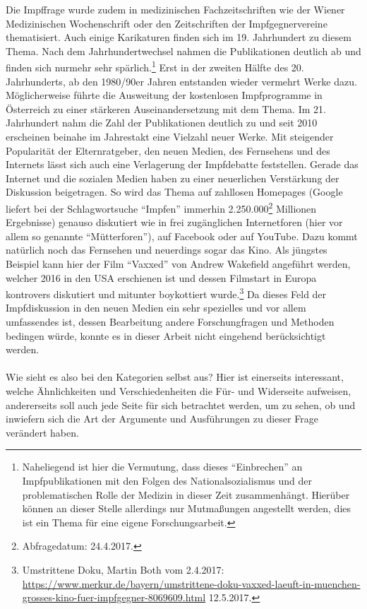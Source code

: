 \documentclass[
    a4paper,
    12pt,
    hyphens,
    chapterprefix=true,
    headheight=33pt,
    footheight=29pt,
    headings=optiontohead, %
]{scrartcl}
\begin{document}
{ Die Impffrage wurde zudem in medizinischen Fachzeitschriften wie der Wiener Medizinischen Wochenschrift oder den Zeitschriften der Impfgegnervereine thematisiert. Auch einige Karikaturen finden sich im 19. Jahrhundert zu diesem Thema. Nach dem Jahrhundertwechsel nahmen die Publikationen deutlich ab und finden sich nurmehr sehr spärlich.\footnote{Naheliegend ist hier die Vermutung, dass dieses "`Einbrechen"' an Impfpublikationen mit den Folgen des Nationalsozialismus und der problematischen Rolle der Medizin in dieser Zeit zusammenhängt. Hierüber können an dieser Stelle allerdings nur Mutmaßungen angestellt werden, dies ist ein Thema für eine eigene Forschungsarbeit.} Erst in der zweiten Hälfte des 20. Jahrhunderts, ab den 1980/90er Jahren entstanden wieder vermehrt Werke dazu. Möglicherweise führte die Ausweitung der kostenlosen Impfprogramme in Österreich zu einer stärkeren Auseinandersetzung mit dem Thema. Im 21. Jahrhundert nahm die Zahl der Publikationen deutlich zu und seit 2010 erscheinen beinahe im Jahrestakt eine Vielzahl neuer Werke. Mit steigender Popularität der Elternratgeber, den neuen Medien, des Fernsehens und des Internets lässt sich auch eine Verlagerung der Impfdebatte feststellen. Gerade das Internet und die sozialen Medien haben zu einer neuerlichen Verstärkung der Diskussion beigetragen. So wird das Thema auf zahllosen Homepages (Google liefert bei der Schlagwortsuche "`Impfen"' immerhin 2.250.000\footnote{Abfragedatum: 24.4.2017.} Millionen Ergebnisse) genauso diskutiert wie in frei zugänglichen Internetforen (hier vor allem so genannte "`Mütterforen"'), auf Facebook oder auf YouTube. Dazu kommt natürlich noch das Fernsehen und neuerdings sogar das Kino. Als jüngstes Beispiel kann hier der Film "`Vaxxed"' von Andrew Wakefield angeführt werden, welcher 2016 in den USA erschienen ist und dessen Filmstart in Europa kontrovers diskutiert und mitunter boykottiert wurde.\footnote{Umstrittene Doku, Martin Both vom 2.4.2017: \url{https://www.merkur.de/bayern/umstrittene-doku-vaxxed-laeuft-in-muenchen-grosses-kino-fuer-impfgegner-8069609.html} 12.5.2017.} Da dieses Feld der Impfdiskussion in den neuen Medien ein sehr spezielles und vor allem umfassendes ist, dessen Bearbeitung andere Forschungfragen und Methoden bedingen würde, konnte es in dieser Arbeit nicht eingehend berücksichtigt werden.\\
\\
Wie sieht es also bei den Kategorien selbst aus? Hier ist einerseits interessant, welche Ähnlichkeiten und Verschiedenheiten die Für- und Widerseite aufweisen, andererseits soll auch jede Seite für sich betrachtet werden, um zu sehen, ob und inwiefern sich die Art der Argumente und Ausführungen zu dieser Frage verändert haben.\\
}
\end{document}
